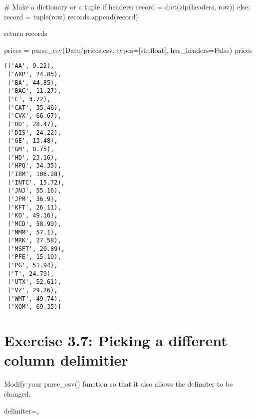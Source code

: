 \documentclass[
  letterpaper,
  DIV=11,
  numbers=noendperiod]{scrreprt}
\newenvironment{Shaded}{\begin{snugshade}}{\end{snugshade}}
\newcommand{\BuiltInTok}[1]{\textcolor[rgb]{0.00,0.46,0.62}{#1}}
\newcommand{\CommentTok}[1]{\textcolor[rgb]{0.37,0.37,0.37}{#1}}
\newcommand{\ControlFlowTok}[1]{\textcolor[rgb]{0.00,0.46,0.62}{#1}}
\newcommand{\NormalTok}[1]{\textcolor[rgb]{0.00,0.46,0.62}{#1}}
\newcommand{\OperatorTok}[1]{\textcolor[rgb]{0.37,0.37,0.37}{#1}}
\newcommand{\StringTok}[1]{\textcolor[rgb]{0.13,0.47,0.30}{#1}}
\newcommand{\VariableTok}[1]{\textcolor[rgb]{0.07,0.07,0.07}{#1}}
\begin{document}
\begin{Shaded}
\begin{Highlighting}[]
            \CommentTok{\# Make a dictionary or a tuple}
            \ControlFlowTok{if}\NormalTok{ headers:}
\NormalTok{                record }\OperatorTok{=} \BuiltInTok{dict}\NormalTok{(}\BuiltInTok{zip}\NormalTok{(headers, row))}
            \ControlFlowTok{else}\NormalTok{:}
\NormalTok{                record }\OperatorTok{=} \BuiltInTok{tuple}\NormalTok{(row)}
\NormalTok{            records.append(record)}

        \ControlFlowTok{return}\NormalTok{ records}
\end{Highlighting}
\end{Shaded}

\begin{Shaded}
\begin{Highlighting}[]
\NormalTok{prices }\OperatorTok{=}\NormalTok{ parse\_csv(}\StringTok{\textquotesingle{}Data/prices.csv\textquotesingle{}}\NormalTok{, types}\OperatorTok{=}\NormalTok{[}\BuiltInTok{str}\NormalTok{,}\BuiltInTok{float}\NormalTok{], has\_headers}\OperatorTok{=}\VariableTok{False}\NormalTok{)}
\NormalTok{prices}
\end{Highlighting}
\end{Shaded}

\begin{verbatim}
[('AA', 9.22),
 ('AXP', 24.85),
 ('BA', 44.85),
 ('BAC', 11.27),
 ('C', 3.72),
 ('CAT', 35.46),
 ('CVX', 66.67),
 ('DD', 28.47),
 ('DIS', 24.22),
 ('GE', 13.48),
 ('GM', 0.75),
 ('HD', 23.16),
 ('HPQ', 34.35),
 ('IBM', 106.28),
 ('INTC', 15.72),
 ('JNJ', 55.16),
 ('JPM', 36.9),
 ('KFT', 26.11),
 ('KO', 49.16),
 ('MCD', 58.99),
 ('MMM', 57.1),
 ('MRK', 27.58),
 ('MSFT', 20.89),
 ('PFE', 15.19),
 ('PG', 51.94),
 ('T', 24.79),
 ('UTX', 52.61),
 ('VZ', 29.26),
 ('WMT', 49.74),
 ('XOM', 69.35)]
\end{verbatim}

\hypertarget{exercise-3.7-picking-a-different-column-delimitier}{%
\section{Exercise 3.7: Picking a different column
delimitier}\label{exercise-3.7-picking-a-different-column-delimitier}}

Modify your parse\_csv() function so that it also allows the delimiter
to be changed.

\begin{Shaded}
\begin{Highlighting}[]
\NormalTok{delimiter}\OperatorTok{=}\StringTok{\textquotesingle{},\textquotesingle{}}
\end{Highlighting}
\end{Shaded}
\end{document}
